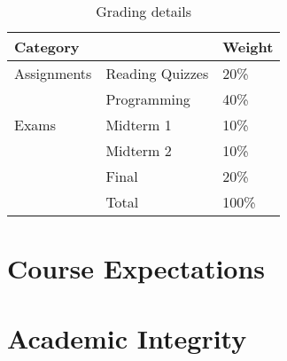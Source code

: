 \documentclass[11pt]{article}
\begin{document}
\begin{table}[htb]
  \centering
\begin{tabular}{lll}
\toprule
Category    &                 & Weight \\
\midrule
Assignments & Reading Quizzes & 20\%   \\
            & Programming     & 40\%   \\
Exams       & Midterm 1       & 10\%   \\
            & Midterm 2       & 10\%   \\
            & Final           & 20\%   \\
\midrule
            & Total           & 100\%  \\
\bottomrule
\end{tabular}
  \caption{Grading details}
  \label{tab:grading}
\end{table}

\begin{comment}
  #+ORGTBL: SEND grades orgtbl-to-latex :splice nil :skip 0 :booktabs t
  | Category    |                 | Weight |
  |-------------+-----------------+--------|
  | Assignments | Reading Quizzes |    20%
  |             | Programming     |    40%
  | Exams       | Midterm 1       |    10%
  |             | Midterm 2       |    10%
  |             | Final           |    20%
  |-------------+-----------------+--------|
  |             | Total           |   100%
  #+TBLFM: @7$3=100*vsum(@I..II);%
\end{comment}

\section{Course Expectations}



\section{Academic Integrity}



\printbibliography{}
\end{document}

